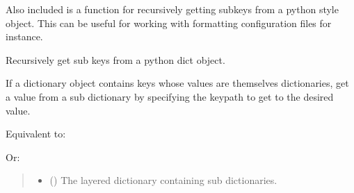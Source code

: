 \documentclass[letterpaper,10pt,english]{sphinxmanual}
\begin{document}
\sphinxAtStartPar
Also included is a function for recursively getting sub\sphinxhyphen{}keys from a python
 style object. This can be useful for working with  formatting
configuration files for instance.

\begin{fulllineitems}
\label{\detokenize{misc:glomar_gridding.io.get_recurse}}
\pysigstartsignatures
\pysiglinewithargsret
{}
{\sphinxparamcomma {}\sphinxparamcomma {}}
{}
\pysigstopsignatures
\sphinxAtStartPar
Recursively get sub keys from a python dict object.

\sphinxAtStartPar
If a dictionary object contains keys whose values are themselves
dictionaries, get a value from a sub dictionary by specifying the key\sphinxhyphen{}path
to get to the desired value.

\sphinxAtStartPar
Equivalent to:

\begin{sphinxVerbatim}[commandchars=\\\{\}]
\PYG{p}{[}\PYG{p}{[}\PYG{p}{]}\PYG{p}{]}\PYG{p}{[}\PYG{p}{[}\PYG{p}{]}\PYG{p}{]}\PYG{p}{[}\PYG{p}{[}\PYG{p}{]}\PYG{p}{]}
\end{sphinxVerbatim}

\sphinxAtStartPar
Or:

\begin{sphinxVerbatim}[commandchars=\\\{\}]
\PYG{p}{[}\PYG{p}{]}\PYG{p}{[}\PYG{p}{]}\PYG{p}{[}\PYG{p}{]}
\end{sphinxVerbatim}
\begin{quote}\begin{description}
\begin{itemize}
\item {}
\sphinxAtStartPar
{} () \textendash{} The layered dictionary containing sub dictionaries.


\end{itemize}
\end{description}
\end{quote}
\end{fulllineitems}
\end{document}

